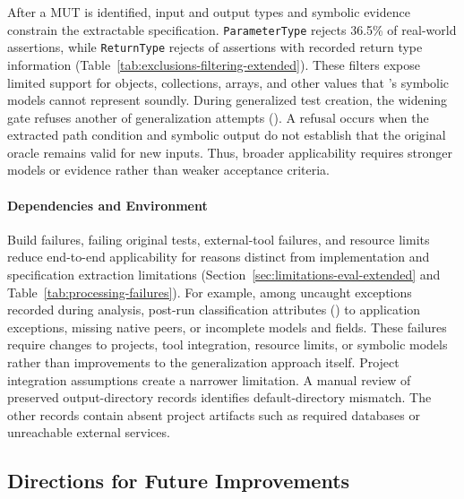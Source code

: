 After a MUT is identified, input and output types and symbolic evidence
constrain the extractable specification.
\texttt{ParameterType} rejects 36.5\% of real-world assertions, while \texttt{ReturnType} rejects
\TzRealworldReturnTypeRejectedPct{} of assertions with recorded return type information
(Table~\ref{tab:exclusions-filtering-extended}).
These filters expose limited support for objects, collections, arrays, and other values that
\ToolSPF{}'s symbolic models cannot represent soundly.
During generalized test creation, the widening gate refuses another \TzRealworldWideningRefusals{} of
\TzRealworldGeneralizationAttempts{} generalization attempts (\TzRealworldWideningRefusalsPct{}).
A refusal occurs when the extracted path condition and symbolic output do not establish
that the original oracle remains valid for new inputs.
Thus, broader applicability requires stronger models or evidence rather than weaker acceptance criteria.

\paragraph{Dependencies and Environment}%
\label{par:environmental-issues}

Build failures, failing original tests, external-tool failures, and resource limits
reduce end-to-end applicability for reasons distinct from
implementation and specification extraction limitations
(Section~\ref{sec:limitations-eval-extended} and Table~\ref{tab:processing-failures}).
For example, among \TzRealworldJpfUncaughtExceptionDiagnostics{} uncaught exceptions
recorded during \ToolSPF{} analysis, post-run classification
attributes \TzRealworldJpfUncaughtExceptionReclassified{}
(\TzRealworldJpfUncaughtExceptionReclassifiedPct{}) to application exceptions,
missing native peers, or incomplete \ToolSPF{} models and fields.
These failures require changes to projects, tool integration, resource limits, or symbolic models
rather than improvements to the generalization approach itself.
Project integration assumptions create a narrower limitation.
A manual review of \TzRqsixReconstructionOutputDirectoriesTotal{} preserved output-directory records
identifies \TzRqsixReconstructionOutputDirectoriesDefaultDirectoryMismatch{} default-directory
mismatch. The other records contain absent project artifacts such as required databases
or unreachable external services.

\subsection{Directions for Future Improvements}%
\label{sec:how-to-improve}

